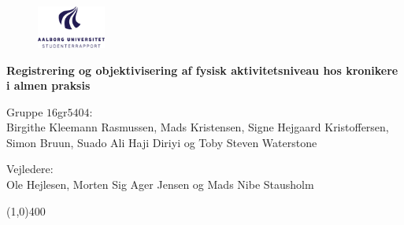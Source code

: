 \clearpage
\thispagestyle{empty}

\begin{figure}[H]
	\raggedleft
		\includegraphics[width=0.2\textwidth]{../figures/aaulogo-da.png}
\end{figure} 
\vspace*{\fill} 
\begin{center}	
\begin{Huge}
\textbf{Registrering og objektivisering af fysisk aktivitetsniveau hos kronikere i almen praksis}\\
\vspace{3 mm}
\end{Huge}
\end{center}
{\large Gruppe $16$gr$5404$:}\\
{\normalsize Birgithe Kleemann Rasmussen, Mads Kristensen, Signe Hejgaard Kristoffersen,}\\ {\normalsize Simon Bruun, Suado Ali Haji Diriyi og Toby Steven Waterstone}

\vspace{3 mm}
\noindent
{\large Vejledere:}\\
{\normalsize Ole Hejlesen, Morten Sig Ager Jensen og Mads Nibe Stausholm}

\vspace*{\fill}

\begin{center}
\line(1,0){400}
\end{center}